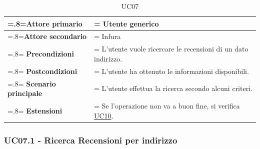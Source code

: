             \begin{table}[H]
                \centering
                \renewcommand{\arraystretch}{1.8}
                \renewcommand\tabularxcolumn[1]{m{#1}}
                \begin{tabularx}{0.9\textwidth} {
                    >{\hsize=.8\hsize\linewidth=\hsize}X
                    >{\hsize=1.2\hsize\linewidth=\hsize}X}
                    \hline
                    \textbf{Attore primario} & Utente generico \\
                    \hline
                    \textbf{Attore secondario} & Infura \\
                    \hline
                    \textbf{Precondizioni} & L'utente vuole ricercare le recensioni di un dato indirizzo. \\
                    \hline
                    \textbf{Postcondizioni} & L'utente ha ottenuto le informazioni disponibili. \\
                    \hline
                    \textbf{Scenario principale} & L'utente effettua la ricerca secondo alcuni criteri. \\
                    \hline
                    \textbf{Estensioni} & Se l'operazione non va a buon fine, si verifica \hyperref[UC10]{UC10}. \\
                    \hline
                \end{tabularx}
                \caption{UC07}
            \end{table}

        \subsubsection{UC07.1 - Ricerca Recensioni per indirizzo}
        \label{UC07.1}

